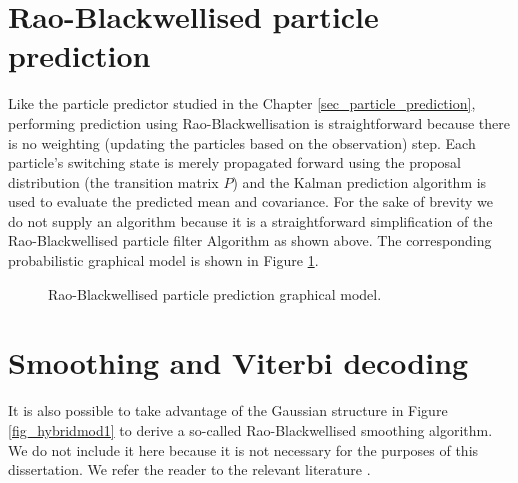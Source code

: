 \section{Rao-Blackwellised particle prediction}
\label{sec_inf_rbpf_pred}
Like the particle predictor studied in the Chapter \ref{sec_particle_prediction}, performing prediction using Rao-Blackwellisation is straightforward because there is no weighting (updating the particles based on the observation) step. Each particle's switching state is merely propagated forward using the proposal distribution (the transition matrix $P$) and the Kalman prediction algorithm is used to evaluate the predicted mean and covariance. For the sake of brevity we do not supply an algorithm because it is a straightforward simplification of the Rao-Blackwellised particle filter Algorithm as shown above. The corresponding probabilistic graphical model is shown in Figure \ref{fig_hybridmod1_prediction}.
\begin{figure}[H] 
\centering
{}
\caption{Rao-Blackwellised particle prediction graphical model.}
\label{fig_hybridmod1_prediction}
\end{figure}

\section{Smoothing and Viterbi decoding}
It is also possible to take advantage of the Gaussian structure in Figure \ref{fig_hybridmod1} to derive a so-called Rao-Blackwellised smoothing algorithm. We do not include it here because it is not necessary for the purposes of this dissertation. We refer the reader to the relevant literature \cite{chen}\cite{doucet}. 

